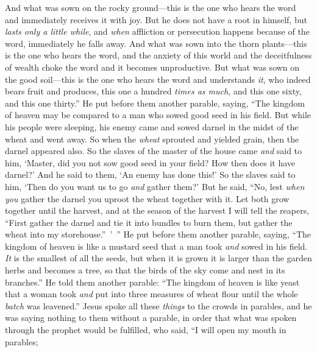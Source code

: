 \begin{biblechapter}
\verse And what was sown on the rocky ground—this is the one who hears the word and immediately receives it with joy.
\verse But he does not have a root in himself, but \textit{lasts only a little while}, and \textit{when} affliction or persecution happens because of the word, immediately he falls away.
\verse And what was sown into the thorn plants—this is the one who hears the word, and the anxiety of this world and the deceitfulness of wealth choke the word and it becomes unproductive.
\verse But what was sown on the good soil—this is the one who hears the word and understands \textit{it}, who indeed bears fruit and produces, this one a hundred \textit{times as much}, and this one sixty, and this one thirty.”
 He put before them another parable, saying, “The kingdom of heaven may be compared to a man who sowed good seed in his field.
\verse But while his people were sleeping, his enemy came and sowed darnel in the midst of the wheat and went away.
\verse So when the \textit{wheat} sprouted and yielded grain, then the darnel appeared also.
\verse So the slaves of the master of the house came \textit{and} said to him, ‘Master, did you not sow good seed in your field? How then does it have darnel?’
\verse And he said to them, ‘An enemy has done this!’ So the slaves said to him, ‘Then do you want us to go \textit{and} gather them?’
\verse But he said, “No, lest \textit{when you} gather the darnel you uproot the wheat together with it.
\verse Let both grow together until the harvest, and at the season of the harvest I will tell the reapers, “First gather the darnel and tie it into bundles to burn them, but gather the wheat into my storehouse.” ’ ”
 He put before them another parable, saying, “The kingdom of heaven is like a mustard seed that a man took \textit{and} sowed in his field.
\verse \textit{It} is the smallest of all the seeds, but when it is grown it is larger than the garden herbs and becomes a tree, so that the birds of the sky come and nest in its branches.”
 He told them another parable: “The kingdom of heaven is like yeast that a woman took \textit{and} put into three measures of wheat flour until the whole \textit{batch} was leavened.”
 Jesus spoke all these \textit{things} to the crowds in parables, and he was saying nothing to them without a parable,
\verse in order that what was spoken through the prophet would be fulfilled, who said, “I will open my mouth in parables; 

\end{biblechapter}
